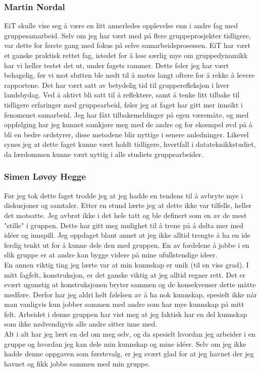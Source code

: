 \subsubsection{Martin Nordal}
EiT skulle vise seg å være en litt annerledes opplevelse enn i andre fag med gruppesamarbeid.
Selv om jeg har vært med på flere gruppeprosjekter tidligere, var dette for første gang med fokus på selve samarbeidsprosessen.
EiT har vært et ganske praktisk rettet fag, istedet for å lese særlig mye om gruppedynamikk har vi heller testet det ut, under fagets rammer.
Dette føler jeg har vært behagelig, før vi mot slutten ble nødt til å møtes langt oftere for å rekke å levere rapportene.
Det har vært satt av betydelig tid til grupperefleksjon i hver landsbydag.
Ved å aktivt bli satt til å reflektere, samt å tenke litt tilbake til tidligere erfaringer med gruppearbeid, føler jeg at faget har gitt mer innsikt i fenomenet samarbeid.
Jeg har fått tilbakemeldinger på egen væremåte, og med oppfølging har jeg kunnet samkjøre meg med de andre og for eksempel øvd på å bli en bedre ordstyrer, disse metodene blir nyttige i senere anledninger.
Likevel synes jeg at dette faget kunne vært holdt tidligere, hvertfall i datateknikkstudiet, da lærdommen kunne vært nyttig i alle studiets gruppearbeider.
\\
\subsubsection{Simen Løvøy Hegge}
Før jeg tok dette faget trodde jeg at jeg hadde en tendens til å avbryte mye i diskusjoner og samtaler.
Etter en stund lærte jeg at dette ikke var tilfelle, heller det motsatte.
Jeg avbrøt ikke i det hele tatt og ble definert som en av de mest "stille" i gruppen.
Dette har gitt meg mulighet til å trene på å delta mer med id\'{e}er og innspill.
Jeg oppdaget blant annet at jeg ikke alltid trengte å ha en ide ferdig tenkt ut for å kunne dele den med gruppen.
En av fordelene å jobbe i en slik gruppe er at andre kan bygge videre på mine ufullstendige ideer.
\\
En annen viktig ting jeg lærte var at min kunnskap er unik (til en viss grad).
I mitt fagfelt, konstruksjon, er det ganske viktig at jeg alltid regner rett.
Det er svært ugunstig at konstruksjonen bryter sammen og de konsekvenser dette måtte medføre.
Derfor har jeg aldri helt følelsen av å ha nok kunnskap, spesielt ikke når man vanligvis kun jobber sammen med andre som har mye kunnskap på mitt felt.
Arbeidet i denne gruppen har vist meg at jeg faktisk har en del kunnskap som ikke nødvendigvis alle andre sitter inne med.
\\
Alt i alt har jeg lært en del om meg selv, og da spesielt hvordan jeg arbeider i en gruppe og hvordan jeg kan dele min kunnskap og mine id\'{e}er.
Selv om jeg ikke hadde denne oppgaven som førstevalg, er jeg svært glad for at jeg havnet der jeg havnet og fikk jobbe sammen med min gruppe.
\\